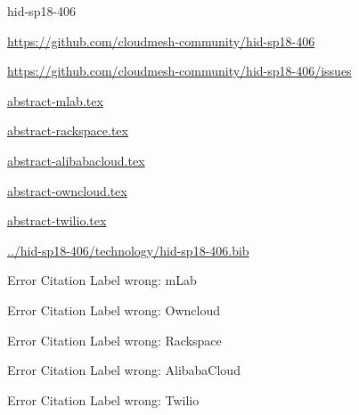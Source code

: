 \begin{IU}

hid-sp18-406

\url{https://github.com/cloudmesh-community/hid-sp18-406}

\url{https://github.com/cloudmesh-community/hid-sp18-406/issues}

\href{https://github.com/cloudmesh-community/hid-sp18-406/blob/master//technology/abstract-mlab.tex}{abstract-mlab.tex}

\href{https://github.com/cloudmesh-community/hid-sp18-406/blob/master//technology/abstract-rackspace.tex}{abstract-rackspace.tex}

\href{https://github.com/cloudmesh-community/hid-sp18-406/blob/master//technology/abstract-alibabacloud.tex}{abstract-alibabacloud.tex}

\href{https://github.com/cloudmesh-community/hid-sp18-406/blob/master//technology/abstract-owncloud.tex}{abstract-owncloud.tex}

\href{https://github.com/cloudmesh-community/hid-sp18-406/blob/master//technology/abstract-twilio.tex}{abstract-twilio.tex}

\href{https://github.com/cloudmesh-community/hid-sp18-406/blob/master//technology/hid-sp18-406.bib}{../hid-sp18-406/technology/hid-sp18-406.bib}

 Error Citation Label wrong: mLab

 Error Citation Label wrong: Owncloud

 Error Citation Label wrong: Rackspace

 Error Citation Label wrong: AlibabaCloud

 Error Citation Label wrong: Twilio

\end{IU}


